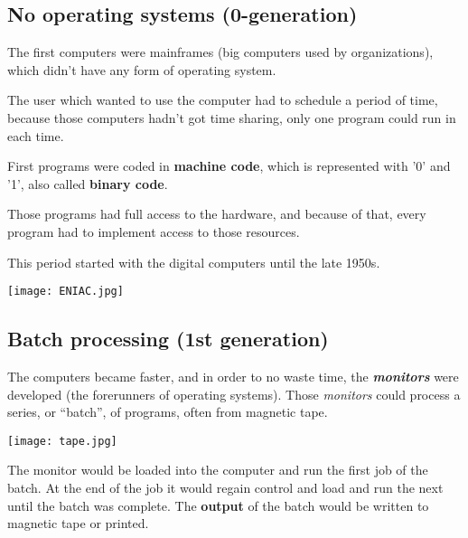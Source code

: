 \subsection{No operating systems (0-generation)}
The first computers were mainframes (big computers used by organizations), which didn't have any form of operating system.

The user which wanted to use the computer had to  schedule a period of time, because those computers hadn't got time sharing, only one program could run in each time.

First programs were coded in \textbf{machine code}, which is represented with '0' and '1', also called \textbf{binary code}.

Those programs had full access to the hardware, and because of that, every program had to implement access to those resources.

This period started with the digital computers until the late 1950s.

\begin{center}
    \texttt{[image: ENIAC.jpg]}
    \vspace{-10pt}\vspace{-13pt}
\end{center}


\hypertarget{1st_generation}{}
\subsection{Batch processing (1st generation)}
The computers became faster, and in order to no waste time, the \textit{\textbf{monitors}} were developed (the forerunners of operating systems). Those \textit{monitors} could process a series, or “batch”, of programs, often from magnetic tape.

\begin{center}
    \texttt{[image: tape.jpg]}
    \vspace{-10pt}\vspace{-13pt}
\end{center}

The monitor would be loaded into the computer and run the first job of the batch. At the end of the job it would regain control and load and run the next until the batch was complete. The \textbf{output} of the batch would be written to magnetic tape or printed.


